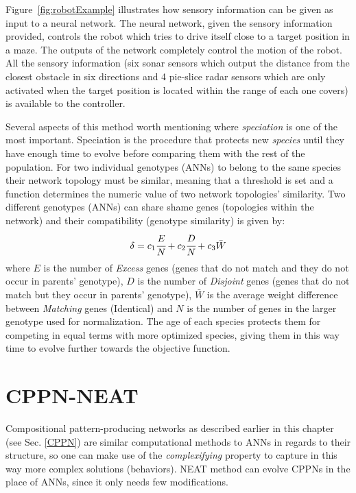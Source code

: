 Figure~\ref{fig:robotExample} illustrates how sensory information can be given as input to a neural network. The neural network, given the sensory information provided, controls the robot which tries to drive itself close to a target position in a maze. The outputs of the network completely control the motion of the robot. All the sensory information (six sonar sensors which output the distance from the closest obstacle in six directions and 4 pie-slice radar sensors which are only activated when the target position is located within the range of each one covers) is available to the controller.

Several aspects of this method worth mentioning where \emph{speciation} is one of the most important. Speciation is the procedure that protects new \emph{species} until they have enough time to evolve before comparing them with the rest of the population. For two individual genotypes (ANNs) to belong to the same species their network topology must be similar, meaning that a threshold is set and a function determines the numeric value of two network topologies' similarity. Two different genotypes (ANNs) can share shame genes (topologies within the network) and their compatibility (genotype similarity) is given by:
\begin{equation}
\label{CompatibilityEquation}
\delta = c_1 \cfrac{E}{N} + c_2 \cfrac{D}{N} + c_3 \bar{W}
\end{equation}
where $E$ is the number of \emph{Excess} genes (genes that do not match and they do not occur in parents' genotype), $D$ is the number of \emph{Disjoint} genes (genes that do not match but they occur in parents' genotype), $\bar{W}$ is the average weight difference between \emph{Matching} genes (Identical) and $N$ is the number of genes in the larger genotype used for normalization.
The age of each species protects them for competing in equal terms with more optimized species, giving them in this way time to evolve further towards the objective function.



\section{CPPN-NEAT}

Compositional pattern-producing networks as described earlier in this chapter (see Sec. \ref{CPPN}) are similar computational methods to ANNs in regards to their structure, so one can make use of the \emph{complexifying} property to capture in this way more complex solutions (behaviors). NEAT method can evolve CPPNs in the place of ANNs, since it only needs few modifications. 

